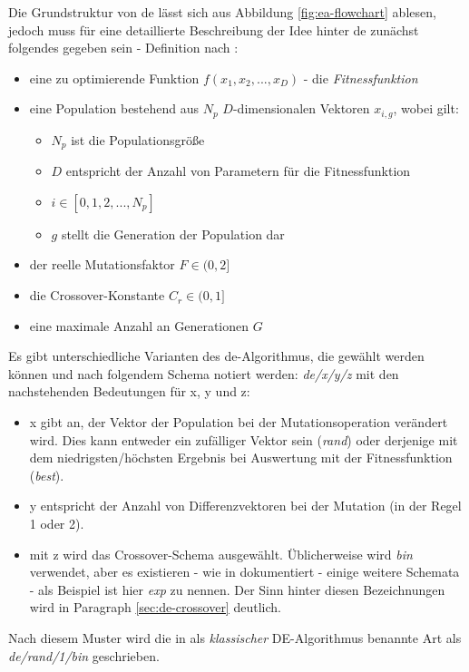 		Die Grundstruktur von \gls{de} lässt sich aus Abbildung 
		\ref{fig:ea-flowchart} ablesen, jedoch muss für eine detaillierte 
		Beschreibung der Idee hinter \gls{de} zunächst folgendes gegeben sein - 
		Definition nach \cite{storn-price-de}:
		\begin{itemize}
			\item eine zu optimierende Funktion $f(x_{1}, x_{2}, ... , x_{D})$ - die \textit{Fitnessfunktion}
			\item eine Population bestehend aus $N_{p}$ $D$-dimensionalen Vektoren $x_{i, g}$, wobei gilt:
			\begin{itemize}
				\item $N_{p}$ ist die Populationsgröße
				\item $D$ entspricht der Anzahl von Parametern für die Fitnessfunktion
				\item $i \in [0,1,2, ... , N_{p}]$
				\item $g$ stellt die Generation der Population dar
			\end{itemize}
			\item der reelle Mutationsfaktor $F \in (0,2]$
			\item die Crossover-Konstante $C_{r} \in (0,1]$
			\item eine maximale Anzahl an Generationen $G$
		\end{itemize}
		
		
		Es gibt unterschiedliche Varianten des \gls{de}-Algorithmus, die 
		gewählt werden können und nach folgendem Schema notiert werden: 
		\textit{\gls{de}/x/y/z} mit den nachstehenden Bedeutungen für x, y 
		und z:
		\begin{itemize}
			\item x gibt an, der Vektor der Population bei der 
			Mutationsoperation verändert wird. Dies kann entweder ein 
			zufälliger Vektor sein (\textit{rand}) oder derjenige mit dem 
			niedrigsten/höchsten Ergebnis bei Auswertung mit der 
			Fitnessfunktion (\textit{best}).
			\item y entspricht der Anzahl von Differenzvektoren bei der 
			Mutation (in der Regel 1 oder 2).
			\item mit z wird das Crossover-Schema ausgewählt. Üblicherweise 
			wird \textit{bin} verwendet, aber es existieren - wie in 
			\mbox{\cite[Seiten 93-97]{storn-price-de-book}} dokumentiert - 
			einige weitere Schemata - als Beispiel ist hier \textit{exp} zu 
			nennen. Der Sinn hinter diesen Bezeichnungen wird in Paragraph 
			\ref{sec:de-crossover} deutlich.
		\end{itemize}
		Nach diesem Muster wird die in \cite[Seite 47]{storn-price-de-book} 
		als \textit{klassischer} DE-Algorithmus benannte Art als 
		\textit{\gls{de}/rand/1/bin} geschrieben.\\
		
